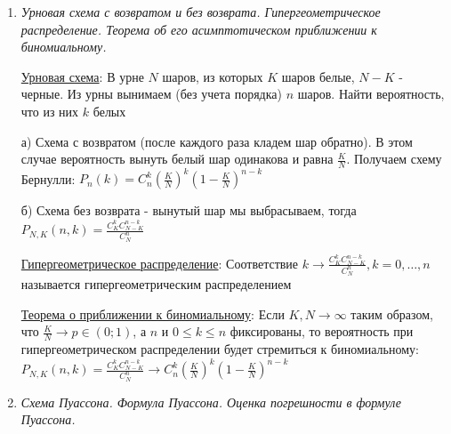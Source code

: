 \documentclass[12pt]{article}
\begin{document}
\begin{enumerate}
    \hyperlink{untilfirstsuccessschema}{Схема до первого успеха}: Пусть проводится бесконечная серия испытаний, которая заканчивается после первого успешного испытания
    под номером $\tau$, тогда вероятность $P(\tau = k) = q^{k - 1} p, \quad\quad k = 1, 2, \dots$

    \hyperlink{geometricdistribution}{Геометрическое распределение}: Соответствие $k \rightarrow q^{k - 1} p, k \in \Natural$ называется геометрическим
    распределение вероятности (обозначается $G_p$ или $G(p)$)

    Геометрическое распределение обладает свойством \enquote{нестарения} или свойством отсутствия
    последействия: \Ths $\letsymbol P(\tau = k) = q^{k - 1} p, k \in \Natural$. Тогда $\forall n, k \geq 0 \quad P(\tau > n + k \ | \ \tau > n) = P(\tau > k)$

    \item \textit{Урновая схема с возвратом и без возврата. Гипергеометрическое распределение. Теорема об его асимптотическом приближении к биномиальному.}

    \hyperlink{urnschema}{Урновая схема}: В урне $N$ шаров, из которых $K$ шаров белые, $N - K$ - черные.
    Из урны вынимаем (без учета порядка) $n$ шаров. Найти вероятность, что из них $k$ белых

    а) Схема с возвратом (после каждого раза кладем шар обратно). В этом случае вероятность вынуть белый шар одинакова и
    равна $\frac{K}{N}$. Получаем схему Бернулли: $P_n(k) = C^k_n \left(\frac{K}{N}\right)^k \left(1 - \frac{K}{N}\right)^{n - k}$

    б) Схема без возврата - вынутый шар мы выбрасываем, тогда
    $P_{N, K} (n, k) = \frac{C^k_K C^{n - k}_{N - K}}{C^n_N}$

    \hyperlink{hypergeometricdistribution}{Гипергеометрическое распределение}: Соответствие $k \rightarrow \frac{C^k_K C^{n - k}_{N - K}}{C^n_N}, k = 0, \dots, n$ называется гипергеометрическим
    распределением

    \hyperlink{hypergeometricasimptotic}{Теорема о приближении к биномиальному}: \Ths Если $K, N \to \infty$ таким образом, что $\frac{K}{N} \to p \in (0;1)$, а $n$ и $0 \leq k \leq n$ фиксированы, то
    вероятность при гипергеометрическом распределении будет стремиться к биномиальному:
    $P_{N,K} (n, k) = \frac{C^k_K C^{n - k}_{N - K}}{C^n_N} \rightarrow C^k_n \left(\frac{K}{N}\right)^k \left(1 - \frac{K}{N}\right)^{n - k}$

    \item \textit{Схема Пуассона. Формула Пуассона. Оценка погрешности в формуле Пуассона.}
    

\end{enumerate}
\end{document}
